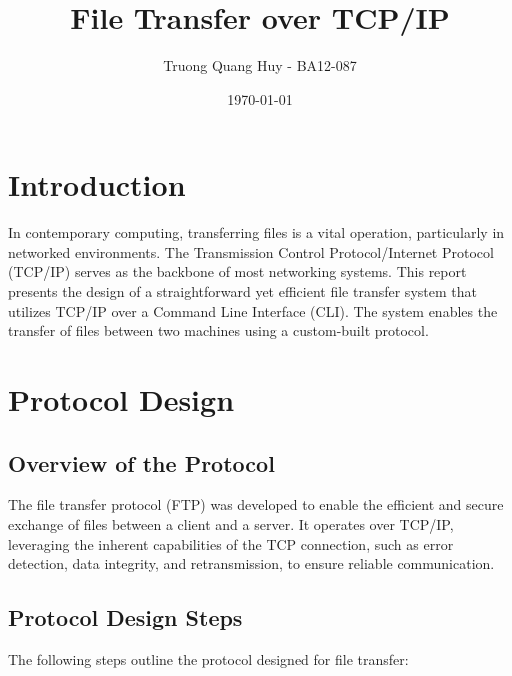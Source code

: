 \documentclass[a4paper,12pt]{article}
\title{File Transfer over TCP/IP }
\author{Truong Quang Huy - BA12-087}
\date{\today}
\begin{document}
\maketitle

\tableofcontents  %


\newpage
\pagebreak



\section{Introduction}
In contemporary computing, transferring files is a vital operation, particularly in networked environments. The Transmission Control Protocol/Internet Protocol (TCP/IP) serves as the backbone of most networking systems. This report presents the design of a straightforward yet efficient file transfer system that utilizes TCP/IP over a Command Line Interface (CLI). The system enables the transfer of files between two machines using a custom-built protocol.

\maketitle
\newpage
\section{Protocol Design}
\subsection{Overview of the Protocol}
The file transfer protocol (FTP) was developed to enable the efficient and secure exchange of files between a client and a server. It operates over TCP/IP, leveraging the inherent capabilities of the TCP connection, such as error detection, data integrity, and retransmission, to ensure reliable communication.

\subsection{Protocol Design Steps}
The following steps outline the protocol designed for file transfer:
\end{document}
